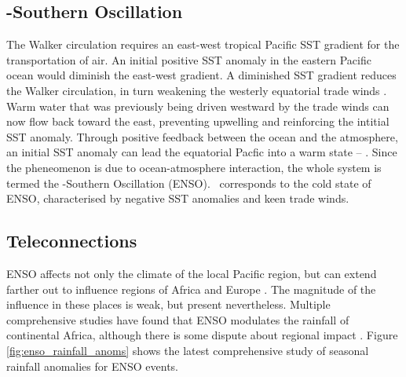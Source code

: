 

\subsection{\elnino-Southern Oscillation}
The Walker circulation requires an east-west tropical Pacific SST gradient for
the transportation of air. An initial positive SST anomaly in the eastern
Pacific ocean would diminish the east-west gradient. A diminished SST gradient
reduces the Walker circulation, in turn weakening the westerly equatorial trade
winds \citep{lindzen1987}. Warm water that was previously being driven westward
by the trade winds can now flow back toward the east, preventing upwelling and
reinforcing the intitial SST anomaly. Through positive feedback between the
ocean and the atmosphere, an initial SST anomaly can lead the equatorial Pacfic
into a warm state -- \elnino. Since the pheneomenon is due to ocean-atmosphere
interaction, the whole system is termed the \elnino-Southern Oscillation
(ENSO). {}\nina\ corresponds to the cold state of ENSO, characterised by
negative SST anomalies and keen trade winds.


\subsection{Teleconnections}
ENSO affects not only the climate of the local Pacific region, but can extend
farther out to influence regions of Africa and Europe \citep{moron1998}. The
magnitude of the influence in these places is weak, but present
nevertheless. Multiple comprehensive studies \citep{ropelewski1987,
  ropelewski1989, nicholson1996} have found that ENSO modulates the rainfall of
continental Africa, although there is some dispute about regional impact
\citep{wolter1989}. Figure \ref{fig:enso_rainfall_anoms} shows the latest
comprehensive study of seasonal rainfall anomalies for ENSO events.

